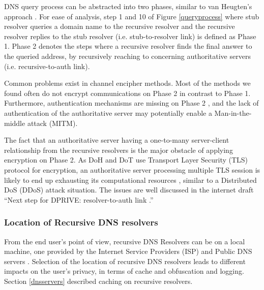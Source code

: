 \documentclass[a4paper,12pt]{article}
\begin{document}
DNS query process can be abstracted into two phases, similar to van Heugten's approach \cite{van2018privacy}.
For ease of analysis, step 1 and 10 of Figure \ref{queryprocess} where stub resolver queries a domain name to the recursive resolver and the recursive resolver replies to the stub resolver (i.e. stub-to-resolver link) is defined as Phase 1.
Phase 2 denotes the steps where a recursive resolver finds the final answer to the queried address, by recursively reaching to concerning authoritative servers (i.e. recursive-to-auth link).

Common problems exist in channel encipher methods.
Most of the methods we found often do not encrypt communications on Phase 2 in contrast to Phase 1.
Furthermore, authentication mechanisms are missing on Phase 2 \cite{I-D.bortzmeyer-dprive-step-2}, and the lack of authentication of the authoritative server may potentially enable a Man-in-the-middle attack (MITM).

The fact that an authoritative server having a one-to-many server-client relationship from the recursive resolvers is the major obstacle of applying encryption on Phase 2.
As DoH \cite{rfc8484} and DoT \cite{hu2016specification} use Transport Layer Security (TLS) protocol \cite{rfc7858} for encryption, an authoritative server processing multiple TLS session is likely to end up exhausting its computational resources \cite{bhople2012server}, similar to a Distributed DoS (DDoS) attack situation. The issues are well discussed in the internet draft ``Next step for DPRIVE: resolver-to-auth link \cite{I-D.bortzmeyer-dprive-step-2}.''

\subsubsection{Location of Recursive DNS resolvers}
From the end user's point of view, recursive DNS Resolvers can be on a local machine, one provided by the Internet Service Providers (ISP) and Public DNS servers \cite{van2018privacy}.
Selection of the location of recursive DNS resolvers leads to different impacts on the user's privacy, in terms of cache and obfuscation and logging. Section \ref{dnsservers} described caching on recursive resolvers.
\end{document}
